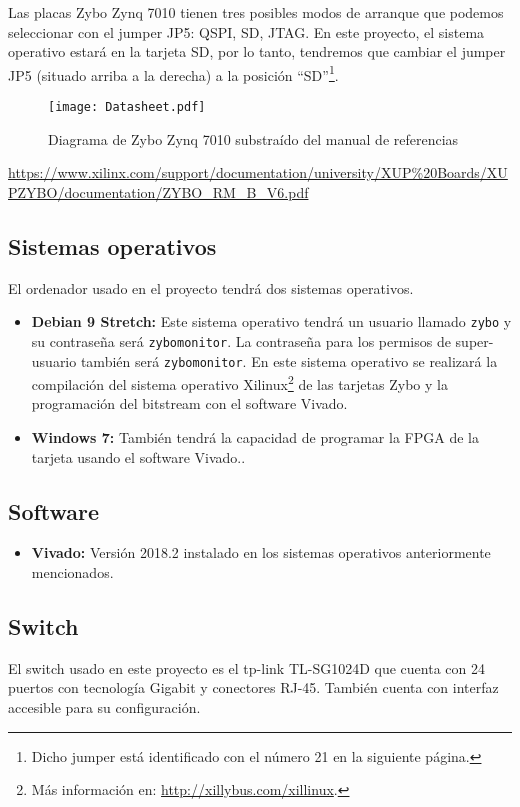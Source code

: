 \documentclass[12pt,letterpaper]{article}
\begin{document}
Las placas Zybo Zynq 7010 tienen tres posibles modos de arranque que podemos seleccionar con el jumper JP5: QSPI, SD, JTAG. En este proyecto, el sistema operativo estará en la tarjeta SD, por lo tanto, tendremos que cambiar el jumper JP5 (situado arriba a la derecha) a la posición ``SD''\footnote{Dicho jumper está identificado con el número 21 en la siguiente página.}.
\newpage
\begin{figure}[h]
	\centering
	\texttt{[image: Datasheet.pdf]}
	\caption{Diagrama de Zybo Zynq 7010 substraído del manual de referencias}
	\label{Datasheet}
\end{figure}
\noindent
\url{https://www.xilinx.com/support/documentation/university/XUP\%20Boards/XUPZYBO/documentation/ZYBO_RM_B_V6.pdf}

\newpage
\subsection{Sistemas operativos}
El ordenador usado en el proyecto tendrá dos sistemas operativos.
\begin{itemize}
	\item \textbf{Debian 9 Stretch:} Este sistema operativo tendrá un usuario llamado \texttt{zybo} y su contraseña será \texttt{zybomonitor}. La contraseña para los permisos de super-usuario también será \texttt{zybomonitor}. En este sistema operativo se realizará la compilación del sistema operativo Xilinux\footnote{Más información en: \url{http://xillybus.com/xillinux}.} de las tarjetas Zybo y la programación del bitstream con el software Vivado.
	\item \textbf{Windows 7:} También tendrá la capacidad de programar la FPGA de la tarjeta usando el software Vivado..
\end{itemize}

\subsection{Software}
\begin{itemize}
	\item \textbf{Vivado:} Versión 2018.2 instalado en los sistemas operativos anteriormente mencionados.
\end{itemize}

\subsection{Switch}
El switch usado en este proyecto es el tp-link TL-SG1024D que cuenta con 24 puertos con tecnología Gigabit y conectores RJ-45. También cuenta con interfaz accesible para su configuración.
\end{document}
